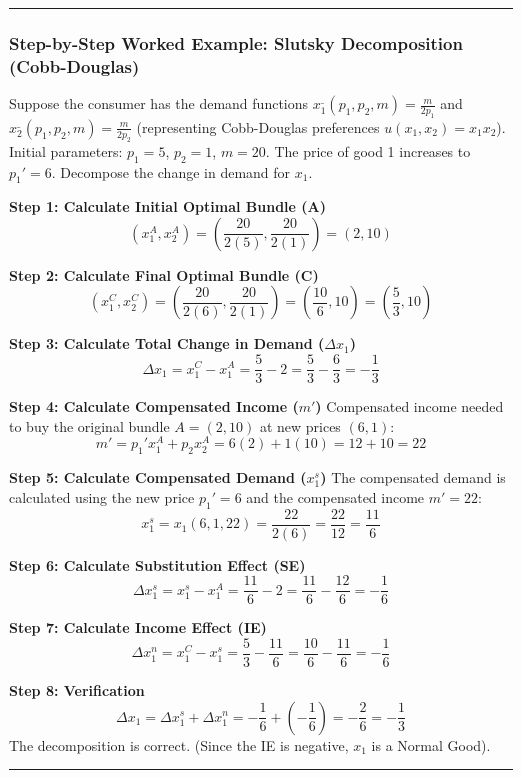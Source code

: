 \documentclass{article}
\begin{document}
\vspace{5pt}\noindent\rule{\linewidth}{0.4pt}\vspace{5pt}

\subsubsection*{Step-by-Step Worked Example: Slutsky Decomposition (Cobb-Douglas)}

Suppose the consumer has the demand functions $x_1^{\_}(p_1, p_2, m) = \frac{m}{2p_1}$ and $x_2^{\_}(p_1, p_2, m) = \frac{m}{2p_2}$ (representing Cobb-Douglas preferences $u(x_1, x_2) = x_1 x_2$). Initial parameters: $p_1=5$, $p_2=1$, $m=20$. The price of good 1 increases to $p_1'=6$. Decompose the change in demand for $x_1$.

\textbf{Step 1: Calculate Initial Optimal Bundle (A)}
\[(x_1^A, x_2^A) = \left(\frac{20}{2(5)}, \frac{20}{2(1)}\right) = (2, 10)\]

\textbf{Step 2: Calculate Final Optimal Bundle (C)}
\[(x_1^C, x_2^C) = \left(\frac{20}{2(6)}, \frac{20}{2(1)}\right) = \left(\frac{10}{6}, 10\right) = \left(\frac{5}{3}, 10\right)\]

\textbf{Step 3: Calculate Total Change in Demand ($\Delta x_1$)}
\[\Delta x_1 = x_1^C - x_1^A = \frac{5}{3} - 2 = \frac{5}{3} - \frac{6}{3} = -\frac{1}{3}\]

\textbf{Step 4: Calculate Compensated Income ($m'$)}
Compensated income needed to buy the original bundle $A=(2, 10)$ at new prices $(6, 1)$:
\[m' = p_1' x_1^A + p_2 x_2^A = 6(2) + 1(10) = 12 + 10 = 22\]

\textbf{Step 5: Calculate Compensated Demand ($x_1^s$)}
The compensated demand is calculated using the new price $p_1'=6$ and the compensated income $m'=22$:
\[x_1^s = x_1(6, 1, 22) = \frac{22}{2(6)} = \frac{22}{12} = \frac{11}{6}\]

\textbf{Step 6: Calculate Substitution Effect (SE)}
\[\Delta x_1^s = x_1^s - x_1^A = \frac{11}{6} - 2 = \frac{11}{6} - \frac{12}{6} = -\frac{1}{6}\]

\textbf{Step 7: Calculate Income Effect (IE)}
\[\Delta x_1^n = x_1^C - x_1^s = \frac{5}{3} - \frac{11}{6} = \frac{10}{6} - \frac{11}{6} = -\frac{1}{6}\]

\textbf{Step 8: Verification}
\[\Delta x_1 = \Delta x_1^s + \Delta x_1^n = -\frac{1}{6} + \left(-\frac{1}{6}\right) = -\frac{2}{6} = -\frac{1}{3}\]
The decomposition is correct. (Since the IE is negative, $x_1$ is a Normal Good).

\vspace{5pt}\noindent\rule{\linewidth}{0.4pt}\vspace{5pt}
\end{document}
